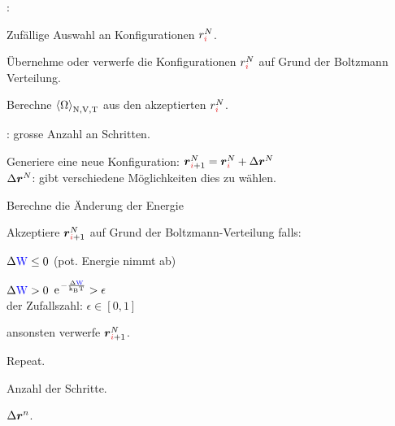 \begin{sectionbox}\nospacing
  :
  \begin{circlelist}
    \item Zufällige Auswahl an Konfigurationen $r_{\idxi}^N$.
    \item Übernehme oder verwerfe die Konfigurationen $r_{\idxi}^N$ auf Grund der Boltzmann Verteilung.
    \item Berechne $\left\langle\Omega\right\rangle_{\mathrm{N},\mathrm{V},\mathrm{T}}$ aus den akzeptierten $r_{\idxi}^N$.
  \end{circlelist}
\end{sectionbox}
\begin{sectionbox}\nospacing
  : grosse Anzahl an Schritten.
  \begin{circlelist}
    \item Generiere eine neue Konfiguration: $\rvec_{\idxi+1}^N=\rvec_{\idxi}^N+\Delta\rvec^N$\\
     $\Delta\boldsymbol r ^N$: gibt verschiedene Möglichkeiten dies zu wählen.
    \item Berechne die Änderung der Energie\\
    \item Akzeptiere $\rvec_{\idxi+1}^N$ auf Grund der Boltzmann-Verteilung falls:
    \begin{numberlist}
        \item $\Delta\textcolor{blue}{\mathrm{W}}\leq0$ (pot. Energie nimmt ab)\hfil{}
        \item $\Delta\textcolor{blue}{\mathrm{W}}>0$\hfil {} \hfil$\e^{-\frac{\Delta\Wpot}{\kb\Tz}}>\epsilon$\\
          \hfil der Zufallszahl: $\epsilon\in[0,1]$
    \end{numberlist}
    ansonsten verwerfe $\rvec_{\idxi+1}^N$.
    \item Repeat.
  \end{circlelist}
  \begin{figure}[H]	
    \centering{
      \def\svgwidth{160pt}
      \resizebox{0.7\linewidth}{!}{}
    }
  \end{figure}
\end{sectionbox}
\begin{notebox}
  \begin{numberlist}
      \item Anzahl der Schritte.
      \item $\Delta\boldsymbol r ^n$.
  \end{numberlist}
\end{notebox}
